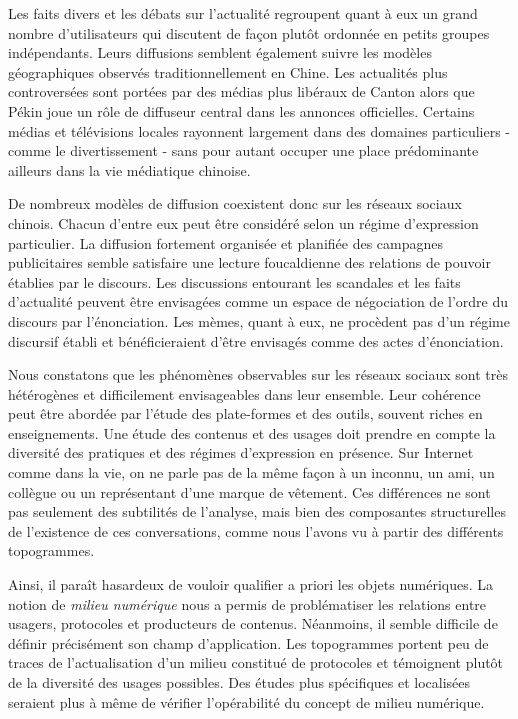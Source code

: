 Les faits divers et les débats sur l'actualité regroupent quant à eux un grand nombre d'utilisateurs qui discutent de façon plutôt ordonnée en petits groupes indépendants. Leurs diffusions semblent également suivre les modèles géographiques observés traditionnellement en Chine. Les actualités plus controversées sont portées par des médias plus libéraux de Canton alors que Pékin joue un rôle de diffuseur central dans les annonces officielles. Certains médias et télévisions locales rayonnent largement dans des domaines particuliers - comme le divertissement - sans pour autant occuper une place prédominante ailleurs dans la vie médiatique chinoise.

De nombreux modèles de diffusion coexistent donc sur les réseaux sociaux chinois. Chacun d'entre eux peut être considéré selon un régime d'expression particulier. La diffusion fortement organisée et planifiée des campagnes publicitaires semble satisfaire une lecture foucaldienne des relations de pouvoir établies par le discours. Les discussions entourant les scandales et les faits d'actualité peuvent être envisagées comme un espace de négociation de l'ordre du discours par l'énonciation. Les mèmes, quant à eux, ne procèdent pas d'un régime discursif établi et bénéficieraient d'être envisagés comme des actes d'énonciation. 

Nous constatons que les phénomènes observables sur les réseaux sociaux sont très hétérogènes et difficilement envisageables dans leur ensemble. Leur cohérence peut être abordée par l'étude des plate-formes et des outils, souvent riches en enseignements. Une étude des contenus et des usages doit prendre en compte la diversité des pratiques et des régimes d'expression en présence. Sur Internet comme dans la vie, on ne parle pas de la même façon à un inconnu, un ami, un collègue ou un représentant d'une marque de vêtement. Ces différences ne sont pas seulement des subtilités de l'analyse, mais bien des composantes structurelles de l'existence de ces conversations, comme nous l'avons vu à partir des différents topogrammes.

Ainsi, il paraît hasardeux de vouloir qualifier a priori les objets numériques. La notion de \textit{milieu numérique} nous a permis de problématiser les relations entre usagers, protocoles et producteurs de contenus. Néanmoins, il semble difficile de définir précisément son champ d'application. Les topogrammes portent peu de traces de l'actualisation d'un milieu constitué de protocoles et témoignent plutôt de la diversité des usages possibles. Des études plus spécifiques et localisées seraient plus à même de vérifier l'opérabilité du concept de milieu numérique. 

